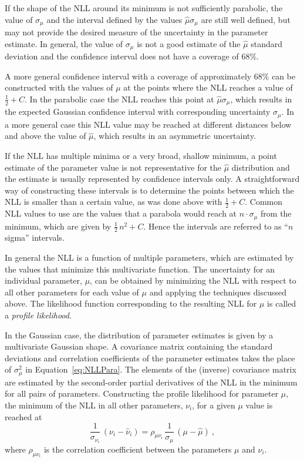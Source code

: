 If the shape of the NLL around its minimum is not sufficiently parabolic, the value of $\sigma_\mu$ and the interval defined by the values
$\hat{\mu}$\textpm$\sigma_\mu$ are still well defined, but may not provide the desired measure of the uncertainty in the parameter
estimate.  In general, the value of $\sigma_\mu$ is not a good estimate of the $\hat{\mu}$ standard deviation and the confidence interval
does not have a coverage of 68\%.

A more general confidence interval with a coverage of approximately 68\% can be constructed with the values of $\mu$ at the points where
the NLL reaches a value of $\tfrac{1}{2}+C$. In the parabolic case the NLL reaches this point at $\hat{\mu}$\textpm$\sigma_\mu$, which
results in the expected Gaussian confidence interval with corresponding uncertainty $\sigma_\mu$. In a more general case this NLL value
may be reached at different distances below and above the value of $\hat{\mu}$, which results in an asymmetric uncertainty.

If the NLL has multiple minima or a very broad, shallow minimum, a point estimate of the parameter value is not representative for the
$\hat{\mu}$ distribution and the estimate is usually represented by confidence intervals only. A straightforward way of constructing these
intervals is to determine the points between which the NLL is smaller than a certain value, as was done above with $\tfrac{1}{2}+C$. Common
NLL values to use are the values that a parabola would reach at $n\cdot\sigma_\mu$ from the minimum, which are given by
$\tfrac{1}{2}\,n^2+C$. Hence the intervals are referred to as ``$n$ sigma'' intervals.

In general the NLL is a function of multiple parameters, which are estimated by the values that minimize this multivariate function.  The
uncertainty for an individual parameter, $\mu$, can be obtained by minimizing the NLL with respect to all other parameters for each value
of $\mu$ and applying the techniques discussed above. The likelihood function corresponding to the resulting NLL for $\mu$ is called a
\emph{profile likelihood}.

In the Gaussian case, the distribution of parameter estimates is given by a multivariate Gaussian shape. A covariance matrix containing the
standard deviations and correlation coefficients of the parameter estimates takes the place of $\sigma_\mu^2$ in Equation~\ref{eq:NLLPara}.
The elements of the (inverse) covariance matrix are estimated by the second-order partial derivatives of the NLL in the minimum for all
pairs of parameters. Constructing the profile likelihood for parameter $\mu$, the minimum of the NLL in all other parameters, $\nu_i$, for
a given $\mu$ value is reached at
\begin{equation}
  \frac{1}{\sigma_{\nu_i}}\, (\nu_i-\hat{\nu}_i)  = \rho_{\mu\nu_i}\, \frac{1}{\sigma_\mu}\, (\mu-\hat{\mu})\ ,
\end{equation}
where $\rho_{\mu\nu_i}$ is the correlation coefficient between the parameters $\mu$ and $\nu_i$.


